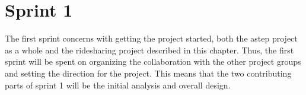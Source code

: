 \chapter{Sprint 1}
The first sprint concerns with getting the project started, both the \gls{astep} project as a whole and the ridesharing project described in this chapter.
Thus, the first sprint will be spent on organizing the collaboration with the other project groups and setting the direction for the project.
This means that the two contributing parts of sprint 1 will be the initial analysis and overall design.


%
%